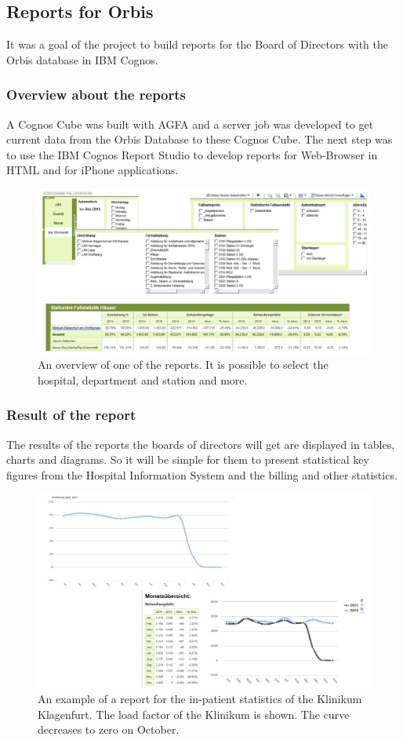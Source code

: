 \documentclass[a4paper]{article}
\begin{document}
	\subsection{Reports for Orbis}
	It was a goal of the project to build reports for the Board of Directors with
	the Orbis database in IBM Cognos. 
	\subsubsection{Overview about the reports}
	A Cognos Cube was built with AGFA and a server job was developed
	to get current data from the Orbis Database to these Cognos Cube.
	The next step was to use the IBM Cognos Report Studio to develop reports for
	Web-Browser in HTML and for iPhone applications.
	\begin{figure}[!ht]
		  \centering
		      \includegraphics[width=1.0\textwidth]{reports_overview}
		  \caption{An overview of one of the reports. It is
		  possible to select the hospital, department and station and more.}
	\end{figure}
	\subsubsection{Result of the report}
	The results of the reports the boards of directors will get are displayed in
	tables, charts and diagrams. So it will be simple for them to present statistical key figures from the Hospital Information System and the
	billing and other statistics.
	\begin{figure}[!ht]
		  \centering
		      \includegraphics[width=1.0\textwidth]{reports_results}
		  \caption{An example of a report for the in-patient statistics of the
		  Klinikum Klagenfurt. The load factor of the Klinikum is shown. The curve decreases to zero on October.}
	\end{figure}
\end{document}
